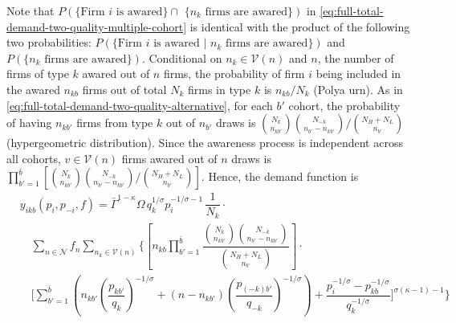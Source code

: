\documentclass[12pt]{article}
\begin{document}
Note that $P( \text{\{Firm $i$ is awared\} $\cap$ \{$n_k$ firms are awared\}})$ in \eqref{eq:full-total-demand-two-quality-multiple-cohort} is identical with the product of the following two probabilities: $P( \text{\{Firm $i$ is awared | $n_k$ firms are awared\}})$ and $P( \text{\{$n_k$ firms are awared\}})$. Conditional on $n_{k} \in \mathcal{V}(n)$ and $n$, the number of firms of type $k$ awared out of $n$ firms, the probability of firm $i$ being included in the awared $n_{kb}$ firms out of total $N_k$ firms in type $k$ is $n_{kb} / N_{k}$ (Polya urn). As in \eqref{eq:full-total-demand-two-quality-alternative}, for each $b'$ cohort, the probability of having $n_{kb'}$ firms from type $k$ out of $n_{b'}$ draws is
$
 {\binom{N_k}{n_{kb'}} \binom{N_{-k}}{n_{b'} - n_{kb'}}}/{\binom{N_H + N_L}{n_{b'}}}
$
(hypergeometric distribution). Since the awareness process is independent across all cohorts, $v \in \mathcal{V}(n)$ firms awared out of $n$ draws is $
\prod_{b'=1}^{\bar b} \left[ {\binom{N_k}{n_{kb'}} \binom{N_{-k}}{n_{b'} - n_{kb'}}}/{\binom{N_H + N_L}{n_{b'}}} \right]$. Hence, the demand function is
\begin{equation}\label{eq:full-total-demand-two-quality-multiple-cohort-alternative}
\begin{aligned}
& y_{ikb}(p_i, p_{-i}, f) 
=  \bar{\Gamma}^{1-\kappa}\Omega \, q_k^{1/\sigma}p_i^{-1/\sigma - 1}\, \dfrac{1}{N_k} \cdot  \\ 
& \quad \sum_{n \in \mathcal{N} } f_n   \sum_{n_k \in \mathcal{V} (n) }  
\Bigg\{
\left[ n_{kb} \prod_{b'=1}^{\bar b} 
 \dfrac{\binom{N_k}{n_{kb'}} \binom{N_{-k}}{n_{b'} - n_{kb'}}}{\binom{N_H + N_L}{n_{b'}}}
\right] \cdot \\ & \quad
\Bigg[
\sum_{b' = 1}^{\bar b} 
\left(
n_{kb'} \left( \dfrac{p_{kb'}}{q_{k}}   \right)^{-1/\sigma} +  
(n - n_{kb'}) \left( \dfrac{p_{(-k)b'}}{q_{-k}}   \right)^{-1/\sigma} \right) + 
\dfrac{p_i^{-1/\sigma} - p^{-1/\sigma}_{kb} }{ q_k^{-1/\sigma }} 
\Bigg]^{\sigma (\kappa - 1)-1} \Bigg\}
\end{aligned}
\end{equation}
\end{document}
